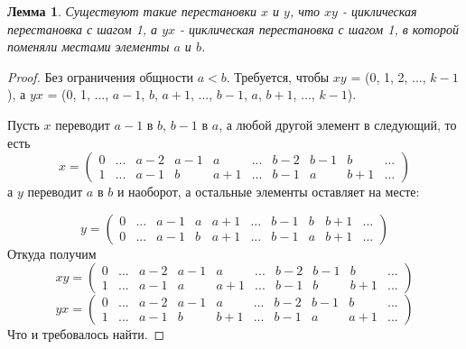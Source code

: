 \documentclass{article}
\newtheorem{lemma}{Лемма}
\begin{document}
	\begin{lemma}
		Существуют такие перестановки $x$ и $y$, что $xy$ - циклическая перестановка с шагом 1, а $yx$ - циклическая перестановка с шагом 1, в которой поменяли местами элементы $a$ и $b$.
	\end{lemma}
	\begin{proof}
		Без ограничения общности $a < b$.
		Требуется, чтобы $xy$ = (0, 1, 2, ..., $k-1$), а $yx$ = (0, 1, ..., $a-1$, $b$, $a+1$, ..., $b-1$, $a$, $b+1$, ..., $k-1$).
		
		Пусть $x$ переводит $a-1$ в $b$, $b-1$ в $a$, а любой другой элемент в следующий, то есть
		$$
		x = 
		\begin{pmatrix}
			0&...&a-2&a-1&a&...&b-2&b-1&b&...\\
			1&...&a-1&b&a+1&...&b-1&a&b+1&...
		\end{pmatrix}
		$$
		а $y$ переводит $a$ в $b$ и наоборот, а остальные элементы оставляет на месте:
		
		$$
		y = 
		\begin{pmatrix}
			0&...&a-1&a&a+1&...&b-1&b&b+1&...\\
			0&...&a-1&b&a+1&...&b-1&a&b+1&...
		\end{pmatrix}
		$$
		Откуда получим 
		$$
		xy = 
		\begin{pmatrix}
			0&...&a-2&a-1&a&...&b-2&b-1&b&...\\
			1&...&a-1&a&a+1&...&b-1&b&b+1&...
		\end{pmatrix}
		$$
		$$
		yx = 
		\begin{pmatrix}
			0&...&a-2&a-1&a&...&b-2&b-1&b&...\\
			1&...&a-1&b&b+1&...&b-1&a&a+1&...
		\end{pmatrix}
		$$
		Что и требовалось найти.
	\end{proof}
\end{document}
